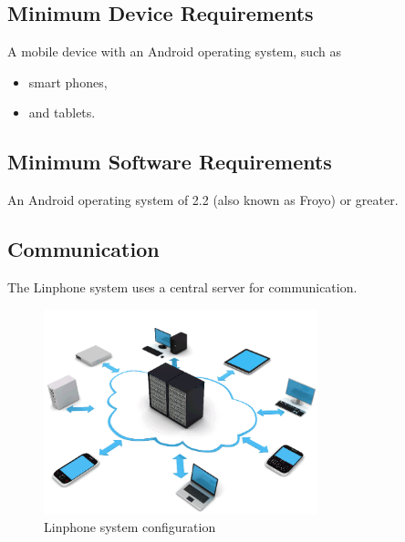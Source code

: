 \documentclass[11pt]{article}
\begin{document}
\subsection{Minimum Device Requirements}
A mobile device with an Android operating system, such as
\begin{itemize}
\item smart phones,
\item and tablets.
\end{itemize}
\subsection{Minimum Software Requirements}
An Android operating system of 2.2 (also known as Froyo) or greater.

\subsection{Communication}

The Linphone system uses a central server for communication.

\begin{figure}[H]
\includegraphics[width=300px]{./images/network.png}
\caption{Linphone system configuration}
\label{Configuration}
\end{figure}


\newpage
\end{document}
